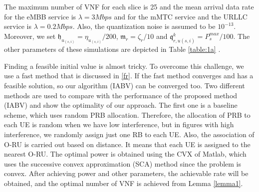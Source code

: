 \documentclass[lettersize,journal]{IEEEtran}
\begin{document}
The maximum number of VNF for each slice is 25 and the mean arrival data rate for the eMBB service is $\lambda  = 3Mbps$ and for the mMTC service and the URLLC  service is $\lambda  = 0.2Mbps$.
Also, the quantization noise is assumed to be $10^{-13}$.
Moreover, we set $\mathfrak{h}_{u_{(s,i)}} = \eta_{u_{(s,i)}}/200$, $\mathfrak{m}_{r} = \zeta_r/10$
and $\mathfrak{q}^k_{r,u(s,i)} = P_{s}^{max}/100$. The other parameters of these simulations are depicted in Table \ref{table:1a} \cite{3GPPTS1, 3GPPTS2, 3GPPTS3, IMT, ETSI1}.
\begin{table}[H]
 \caption {Simulation Parameters} \label{table:1a}
 \begin{center}
 \end{center}
 \end{table}
Finding a feasible initial value is almost tricky. To overcome this challenge, we use a fast method that is discussed in \ref{fr}. If the fast method converges and has a feasible solution, so our algorithm (IABV) can be converged too.
Two different methods are used to compare with the performance of the proposed method (IABV) and show the optimality of our approach.
The first one is a baseline scheme, which uses random PRB allocation. Therefore, the allocation of PRB to each UE is random when we have low interference, but in figures with high interference, we randomly assign just one RB to each UE. Also, the association of O-RU is carried out based on distance. It means that each UE is assigned to the nearest O-RU. The optimal power is obtained using the CVX of Matlab, which uses the successive convex approximation (SCA) method since the problem is convex.
After achieving power and other parameters, the achievable rate will be obtained, and the optimal number of VNF is achieved from Lemma \eqref{lemma1}.
\end{document}
